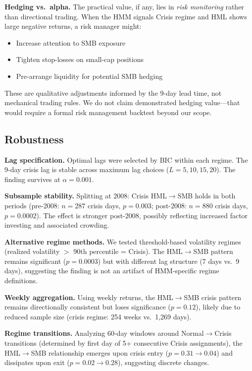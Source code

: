 \documentclass[sigconf]{acmart}
\begin{document}
\textbf{Hedging vs.\ alpha.} The practical value, if any, lies in \emph{risk monitoring}
rather than directional trading. When the HMM signals Crisis regime and HML shows
large negative returns, a risk manager might:
\begin{itemize}
    \item Increase attention to SMB exposure
    \item Tighten stop-losses on small-cap positions
    \item Pre-arrange liquidity for potential SMB hedging
\end{itemize}

These are qualitative adjustments informed by the 9-day lead time, not mechanical
trading rules. We do not claim demonstrated hedging value---that would require
a formal risk management backtest beyond our scope.

\subsection{Robustness}

\textbf{Lag specification.} Optimal lags were selected by BIC within each regime.
The 9-day crisis lag is stable across maximum lag choices ($L = 5, 10, 15, 20$).
The finding survives at $\alpha = 0.001$.

\textbf{Subsample stability.} Splitting at 2008: Crisis HML$\to$SMB holds in both
periods (pre-2008: $n = 287$ crisis days, $p = 0.003$; post-2008: $n = 880$ crisis
days, $p = 0.0002$). The effect is stronger post-2008, possibly reflecting increased
factor investing and associated crowding.

\textbf{Alternative regime methods.} We tested threshold-based volatility regimes
(realized volatility $>$ 90th percentile = Crisis). The HML$\to$SMB pattern remains
significant ($p = 0.0003$) but with different lag structure (7 days vs.\ 9 days),
suggesting the finding is not an artifact of HMM-specific regime definitions.

\textbf{Weekly aggregation.} Using weekly returns, the HML$\to$SMB crisis pattern
remains directionally consistent but loses significance ($p = 0.12$), likely due
to reduced sample size (crisis regime: 254 weeks vs.\ 1,269 days).

\textbf{Regime transitions.} Analyzing 60-day windows around Normal$\to$Crisis
transitions (determined by first day of 5+ consecutive Crisis assignments),
the HML$\to$SMB relationship emerges upon crisis entry ($p = 0.31 \to 0.04$)
and dissipates upon exit ($p = 0.02 \to 0.28$), suggesting discrete changes.
\end{document}
